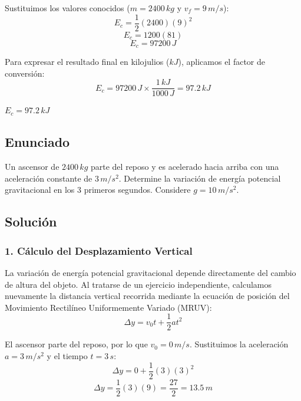 \documentclass[12pt, a4paper]{article}
\begin{document}
Sustituimos los valores conocidos ($m = 2400 \, \si{kg}$ y $v_f = 9 \, \si{m/s}$):
$$E_c = \frac{1}{2} (2400) (9)^2$$
$$E_c = 1200 (81)$$
$$E_c = 97200 \, \si{J}$$

Para expresar el resultado final en kilojulios ($\si{kJ}$), aplicamos el factor de conversión:
$$E_c = 97200 \, \si{J} \times \frac{1 \, \si{kJ}}{1000 \, \si{J}} = 97.2 \, \si{kJ}$$

\begin{tcolorbox}[colback=green!5!white, colframe=green!50!black, title=Respuesta Final]
\centering \Large $E_c = 97.2 \, \si{kJ}$
\end{tcolorbox}

\newpage

\subsection*{Enunciado}
Un ascensor de $2400 \, \si{kg}$ parte del reposo y es acelerado hacia arriba con una aceleración constante de $3 \, \si{m/s^2}$. Determine la variación de energía potencial gravitacional en los $3$ primeros segundos. Considere $g = 10 \, \si{m/s^2}$.

\begin{center}
\end{center}

\subsection*{Solución}

\subsubsection*{1. Cálculo del Desplazamiento Vertical}
La variación de energía potencial gravitacional depende directamente del cambio de altura del objeto. Al tratarse de un ejercicio independiente, calculamos nuevamente la distancia vertical recorrida mediante la ecuación de posición del Movimiento Rectilíneo Uniformemente Variado (MRUV):
$$ \Delta y = v_0 t + \frac{1}{2} a t^2 $$

El ascensor parte del reposo, por lo que $v_0 = 0 \, \si{m/s}$. Sustituimos la aceleración $a = 3 \, \si{m/s^2}$ y el tiempo $t = 3 \, \si{s}$:
$$ \Delta y = 0 + \frac{1}{2} (3) (3)^2 $$
$$ \Delta y = \frac{1}{2} (3) (9) = \frac{27}{2} = 13.5 \, \si{m} $$
\end{document}
